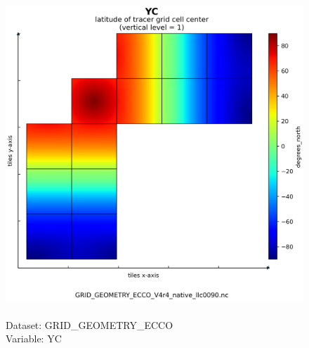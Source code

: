 \begin{figure}[H]
\centering
\includegraphics[scale=0.5]{../images/plots/native_plots_coords/Geometry_Parameters_for_the_Lat-Lon-Cap_90_(llc90)_Native_Model_Grid_(Version_4_Release_4)/YC.png}
\caption{\\Dataset: GRID\_GEOMETRY\_ECCO\\Variable: YC}
\label{tab:table-GRID_GEOMETRY_ECCO_YC-Plot}
\end{figure}
\pagebreak
